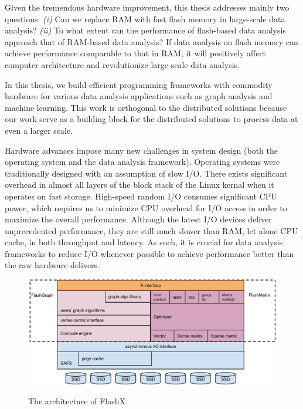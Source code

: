 Given the tremendous hardware improvement, this thesis addresses mainly two
questions: \textit{(i)} Can we replace RAM with fast flash memory in large-scale
data analysis? \textit{(ii)} To what extent
can the performance of flash-based data analysis approach that of RAM-based
data analysis? If data analysis on flash memory can achieve performance comparable to
that in RAM, it will positively affect computer architecture and revolutionize
large-scale data analysis.

In this thesis, we build
efficient programming frameworks with commodity hardware for various
data analysis applications such as graph analysis and machine learning.
This work is orthogonal to the distributed solutions because our work serve as
a building block
for the distributed solutions to process data at even a larger scale.

Hardware advances impose many new challenges in system design (both the operating
system and the data analysis framework). Operating systems were traditionally
designed with an assumption of slow I/O. There exists significant overhead in
almost all layers of the block stack of the Linux kernal when it operates on
fast storage. High-speed random I/O consumes significant CPU power, which
requires us to minimize CPU overhead for I/O access in order to maximize
the overall performance. Although the latest I/O devices deliver unprecedented
performance, they are still much slower than RAM, let alone CPU cache, in both
throughput and latency. As such, it is crucial for data analysis frameworks to
reduce I/O whenever
possible to achieve performance better than the raw hardware delivers.

\makeatletter
\let\@currsize\normalsize
\makeatother

\begin{figure}[t]
\centering
\includegraphics[scale=0.5]{figs/arch.pdf}
\label{fig:arch}
\caption{The architecture of FlashX.}
\end{figure}

